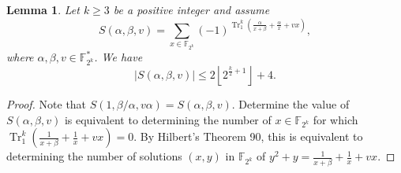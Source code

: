 \documentclass{article}
\newcommand{\F}{\mathbb{F}}
\newcommand{\0}{\textbf{0}}
\newcommand{\1}{\textbf{1}}
\newcommand{\TRACE}{\operatorname{Tr}_1^k}
\theoremstyle{plain}
\newtheorem{lemma}{Lemma}
\begin{document}
    \begin{lemma}
        Let $ k\ge 3 $ be a positive integer and assume 
        \[S(\alpha,\beta,v)=\sum_{x\in\F_{2^k}}(-1)^{\TRACE\left( \frac{\alpha}{x+\beta}+\frac{\alpha}{x}+vx \right)},\]
        where $ \alpha,\beta,v\in\F_{2^k}^* $. We have 
        \[\left\lvert S(\alpha,\beta,v)\right\rvert\le 2\left\lfloor 2^{\frac{k}{2}+1}\right\rfloor+4 .\]
    \end{lemma}
    \begin{proof}
        Note that $ S(1,\beta/\alpha,v\alpha)=S(\alpha,\beta,v) $.
        Determine the value of $ S(\alpha,\beta,v) $ is equivalent to determining the number of $ x\in\F_{2^k} $ 
        for which $ \TRACE\left( \frac{1}{x+\beta}+\frac{1}{x}+vx \right)=0 $. 
        By Hilbert's Theorem 90, this is equivalent to determining the number of solutions $ (x,y) $ 
        in $ \F_{2^k} $ of $ y^2+y=\frac{1}{x+\beta}+\frac{1}{x}+vx $.
        

\end{proof}
\end{document}
